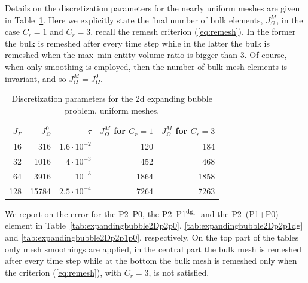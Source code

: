 Details on the discretization parameters for the nearly uniform meshes are
given in Table~\ref{tab:expandingbubble2Delements}. Here we explicitly
state the final number of bulk elements, $J_\Omega^M$, in the case $C_r = 1$
and $C_r = 3$, recall the remesh criterion (\ref{eq:remesh}). In the former the
bulk is remeshed after every time step while in the latter the bulk is remeshed
when the max--min entity volume ratio is bigger than 3. Of course, when only
smoothing is employed, then the number of bulk mesh elements is invariant, and
so $J_\Omega^M = J_\Omega^0$.
\begin{table}
\center
\begin{tabular}{rrrrr}
\hline
$J_\Gamma$ & $J_\Omega^0$ & $\tau$ & $J_\Omega^M$ for $C_r=1$ &
$J_\Omega^M$ for $C_r=3$ \\
\hline
 16 &   316 & $1.6\cdot10^{-2}$ &  120 &  184 \\
 32 &  1016 &   $4\cdot10^{-3}$ &  452 &  468 \\
 64 &  3916 &         $10^{-3}$ & 1864 & 1858 \\
128 & 15784 & $2.5\cdot10^{-4}$ & 7264 & 7263 \\
\hline
\end{tabular}
\caption[Stokes expanding bubble uniform meshes parameters]
{Discretization parameters for the 2d expanding bubble problem, uniform meshes.}
\label{tab:expandingbubble2Delements}
\end{table}
We report on the error for the P2--P0, the P2--${\rm P1}^{{\rm dg}_\Gamma}$ and the P2--(P1+P0)
element in Table~\ref{tab:expandingbubble2Dp2p0},
\ref{tab:expandingbubble2Dp2p1dg} and \ref{tab:expandingbubble2Dp2p1p0},
respectively. On the top part of the tables only mesh smoothings are applied,
in the central part the bulk mesh is remeshed after every time step while at
the bottom the bulk mesh is remeshed only when the criterion (\ref{eq:remesh}),
with $C_r=3$, is not satisfied.
